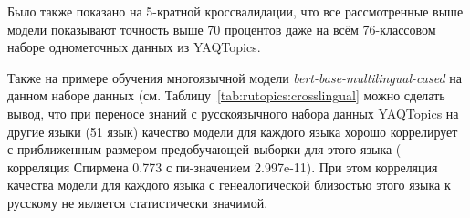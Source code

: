 Было также показано на 5-кратной кроссвалидации, что все рассмотренные выше модели показывают точность выше 70 процентов даже на всём 76-классовом наборе однометочных данных из YAQTopics.

Также на примере обучения многоязычной модели \textit{bert-base-multilingual-cased} на данном наборе данных (см. Таблицу~\ref{tab:rutopics:crosslingual} можно сделать вывод, что при переносе знаний с русскоязычного набора данных YAQTopics на другие языки (51 язык) качество модели для каждого языка хорошо коррелирует с приближенным размером предобучающей выборки для этого языка ( корреляция Спирмена 0.773 с пи-значением 2.997e-11). При этом корреляция качества модели для каждого языка с генеалогической близостью этого языка к русскому не является статистически значимой.
\begin{table*}
\caption{Точность (f1) модели \textit{bert-base-multilingual-cased} на объединенном тестовом наборе данных {MASSIVE} для всех языков. Модель обучалась на версии \textbf{Q} набора данных {YAQTopics}. \textbf{Код} означает код языка(ISO 639-1), \textbf{N} означает число статей в Википедии на этом языке на 11 октября 2018 года, \textbf{Дистанция} означает лингвистическую дистанцию между этим языком и русским, посчитанную в соответствии с работой~\cite{lang_sim}. Усреднено по трем запускам.}
\label{tab:rutopics:crosslingual}
\centering
\end{table*}
